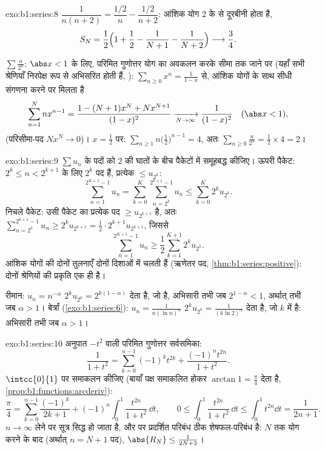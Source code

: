 \begin{solution}{exo:b1:series:8}
$\dfrac{1}{n(n+2)} = \dfrac{1/2}{n} - \dfrac{1/2}{n+2}$: आंशिक योग $2$ के
 से दूरबीनी होता है,
\[
S_N = \frac12\Bigl(1 + \frac12 - \frac{1}{N+1} -
\frac{1}{N+2}\Bigr) \longrightarrow \frac34 .
\]

$\sum \frac{n}{2^n}$: $\abs x < 1$ के लिए, परिमित गुणोत्तर योग का अवकलन करके
सीमा तक जाने पर (यहाँ सभी श्रेणियाँ निरपेक्ष रूप से अभिसरित होती हैं, ): $\sum_{n\geq0} x^n = \frac{1}{1-x}$ से, आंशिक योगों के साथ सीधी
संगणना करने पर मिलता है
\[
\sum_{n=1}^{N} n x^{n-1}
= \frac{1 - (N+1)x^N + N x^{N+1}}{(1 - x)^2}
\xrightarrow[N\to\infty]{} \frac{1}{(1-x)^2}
\quad (\abs x < 1),
\]
(परिसीमा-पद $N x^N \to 0$)। $x = \frac12$ पर: $\sum_{n\geq1}
n\bigl(\frac12\bigr)^{n-1} = 4$, अतः $\sum_{n\geq0} \frac{n}{2^n} = \frac12
\times 4 = 2$।
\end{solution}

\begin{solution}{exo:b1:series:9}
$\sum u_n$ के पदों को $2$ की घातों के बीच पैकेटों में समूहबद्ध कीजिए। ऊपरी
पैकेट: $2^k \leq n < 2^{k+1}$ के लिए $2^k$ पद हैं, प्रत्येक $\leq u_{2^k}$:
\[
\sum_{n=1}^{2^{K+1}-1} u_n
= \sum_{k=0}^{K} \sum_{n=2^k}^{2^{k+1}-1} u_n
\leq \sum_{k=0}^{K} 2^k u_{2^k} .
\]
निचले पैकेट: उसी पैकेट का प्रत्येक पद $\geq u_{2^{k+1}}$ है, अतः
$\sum_{n=2^k}^{2^{k+1}-1} u_n \geq 2^k u_{2^{k+1}} = \frac12 \cdot 2^{k+1}
u_{2^{k+1}}$, जिससे
\[
\sum_{n=1}^{2^{K+1}-1} u_n \geq \frac12 \sum_{k=1}^{K+1} 2^{k}
u_{2^{k}} .
\]
आंशिक योगों की दोनों तुलनाएँ दोनों दिशाओं में चलती हैं (ऋणेतर पद,
\cref{thm:b1:series:positive}): दोनों श्रेणियों की प्रकृति एक ही है।

रीमान: $u_n = n^{-\alpha}$ $2^k u_{2^k} = 2^{k(1-\alpha)}$ देता है, जो
 है, अभिसारी तभी जब $2^{1 - \alpha} < 1$, अर्थात् तभी जब
$\alpha > 1$। बेर्त्रां (\cref{exo:b1:series:6}): $u_n = \frac{1}{n(\ln
n)^\alpha}$ $2^k u_{2^k} = \frac{1}{(k\ln 2)^\alpha}$ देता है, जो $k$ में
 है: अभिसारी तभी जब $\alpha > 1$।
\end{solution}

\begin{solution}{exo:b1:series:10}
अनुपात $-t^2$ वाली परिमित गुणोत्तर सर्वसमिका:
\[
\frac{1}{1 + t^2} = \sum_{k=0}^{n-1} (-1)^k t^{2k}
+ \frac{(-1)^n t^{2n}}{1 + t^2} .
\]
$\intcc{0}{1}$ पर समाकलन कीजिए (बायाँ पक्ष समाकलित होकर $\arctan 1 =
\frac\pi4$ देता है, \cref{prop:b1:functions:arcderiv}):
\[
\frac{\pi}{4} = \sum_{k=0}^{n-1} \frac{(-1)^k}{2k+1}
+ (-1)^n \int_0^1 \frac{t^{2n}}{1+t^2}\,\dd t,
\qquad
0 \leq \int_0^1 \frac{t^{2n}}{1+t^2}\,\dd t \leq \int_0^1 t^{2n}\dd
t = \frac{1}{2n+1} .
\]
$n \to \infty$ लेने पर सूत्र सिद्ध हो जाता है, और  पर प्रदर्शित परिबंध
ठीक शेषफल-परिबंध है: $N$ तक योग करने के बाद (अर्थात् $n = N + 1$ पद),
$\abs{R_N} \leq \frac{1}{2N + 3}$।
\end{solution}

